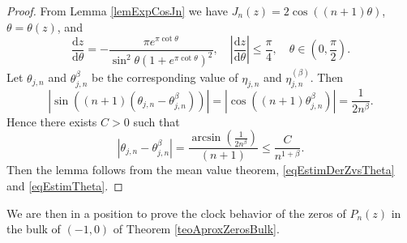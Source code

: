\documentclass[11pt]{article}
\newcommand{\dd}{\mathrm{d}}
\begin{document}
\begin{proof} From Lemma \ref{lemExpCosJn} we have $J_n(z)=2\cos((n+1)\theta)$, $\theta=\theta(z)$, and
\begin{equation}
\label{eqEstimDerZvsTheta}
 \frac{\dd z}{\dd\theta}=-\frac{\pi e^{\pi\cot\theta}}{\sin^2\theta(1+e^{\pi\cot\theta})^2},\quad \left|\frac{\dd z}{\dd\theta}\right|\le \frac{\pi}{4},\quad \theta\in(0,\frac{\pi}{2}).
\end{equation}
Let $\theta_{j,n}$ and $\theta_{j,n}^{\beta}$ be the corresponding value of $\eta_{j,n}$ and $\eta_{j,n}^{(\beta)}$. Then
\[
|\sin((n+1)(\theta_{j,n}-\theta_{j,n}^{\beta}))|=\left|\cos\left((n+1)\theta_{j,n}^{\beta}\right)\right|=\frac{1}{2n^{\beta}}.
\]
Hence there exists $C>0$ such that
\begin{equation}
\label{eqEstimTheta}
|\theta_{j,n}-\theta_{j,n}^{\beta}|=\frac{\arcsin(\frac{1}{2n^{\beta}})}{(n+1)}\le \frac{C}{n^{1+\beta}}.
\end{equation}
Then the lemma follows from the mean value theorem, \eqref{eqEstimDerZvsTheta} and \eqref{eqEstimTheta}.
\end{proof}

We are then in a position to prove the clock behavior of the zeros of $P_n(z)$ in the bulk of $(-1,0)$ of Theorem \ref{teoAproxZerosBulk}.
\end{document}
